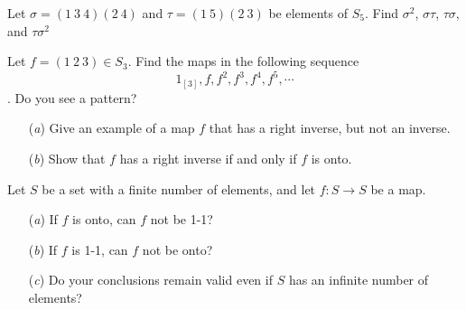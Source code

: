 \documentclass[12pt,letterpaper,boxed]{hmcpset}
\begin{document}

\begin{problem}[1.2.4]
Let $ \sigma  = (1 \ 3 \ 4)(2 \ 4)$ and $ \tau = (1 \ 5)(2 \ 3)$ be elements of $S_5$. Find $\sigma^2$, $\sigma\tau$, $\tau\sigma$, and $\tau\sigma^2$
\end{problem}

\begin{solution}

\end{solution}

\clearpage

\begin{problem}[1.2.6]
Let $ f = (1 \ 2 \ 3) \in S_3 $. Find the maps in the following sequence $$ 1_{[3]}, f, f^2, f^3, f^4, f^5, \cdots $$. Do you see a pattern?
\end{problem}

\begin{solution}
\end{solution}

\clearpage

\begin{problem}[1.2.15]
\begin{itemize}
  \item[(\textit{a})] Give an example of a map $ f $ that has a right inverse, but not an inverse. 
  
  \item[(\textit{b})] Show that $ f $ has a right inverse if and only if $ f $ is onto. 
\end{itemize}
\end{problem}

\begin{solution}
\end{solution}

\clearpage


\begin{problem}[1.2.20]
Let $ S $ be a set with a finite number of elements, and let $ f: S \to S $ be a map.
\begin{itemize}
  \item[(\textit{a})] If $ f $ is onto, can $ f $ not be 1-1?
  
  \item[(\textit{b})] If $ f $ is 1-1, can $ f $ not be onto? 
  
  \item[(\textit{c})] Do your conclusions remain valid even if $ S $ has an infinite number of elements?
\end{itemize}
\end{problem}
\end{document}
